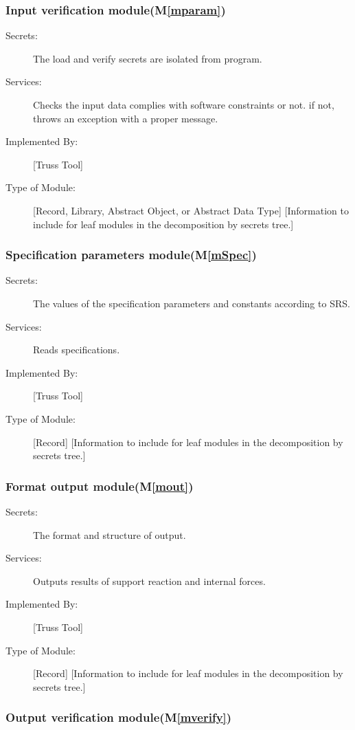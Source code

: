 \documentclass[12pt, titlepage]{article}
\newcommand{\mref}[1]{M\ref{#1}}
\begin{document}
\subsubsection{Input verification module(\mref{mparam})}

\begin{description}
\item[Secrets:]The load and verify secrets are isolated from program.
\item[Services:] Checks the input data complies with software constraints or not. if not, throws an exception with a proper message.
\item[Implemented By:] [Truss Tool]
\item[Type of Module:] [Record, Library, Abstract Object, or Abstract Data Type]
  [Information to include for leaf modules in the decomposition by secrets tree.]
\end{description}
\subsubsection{Specification parameters module(\mref{mSpec})}

\begin{description}
\item[Secrets:]The values of the specification parameters and constants according to SRS.
\item[Services:] Reads specifications.
\item[Implemented By:] [Truss Tool]
\item[Type of Module:] [Record]
  [Information to include for leaf modules in the decomposition by secrets tree.]
\end{description}
\subsubsection{Format output module(\mref{mout})}

\begin{description}
\item[Secrets:]The format and structure of output.
\item[Services:] Outputs results of support reaction and internal forces.
\item[Implemented By:] [Truss Tool]
\item[Type of Module:] [Record]
  [Information to include for leaf modules in the decomposition by secrets tree.]
\end{description}
\subsubsection{Output verification module(\mref{mverify})}
\end{document}
